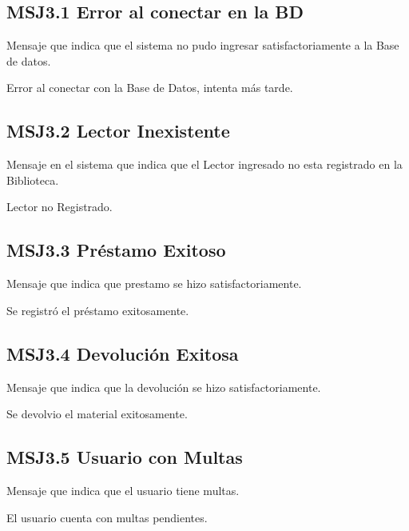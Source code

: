 


\subsection{MSJ3.1 Error al conectar en la BD }

Mensaje que indica que el sistema no pudo ingresar satisfactoriamente a la Base de datos.

  \noindent Error al conectar con la Base de Datos, intenta más tarde.

\subsection{MSJ3.2 Lector Inexistente }

Mensaje en el sistema que indica que el Lector ingresado no esta registrado en la Biblioteca.

  \noindent Lector no Registrado.
 
\subsection{MSJ3.3 Préstamo Exitoso }

Mensaje que indica que prestamo se hizo satisfactoriamente.

  \noindent Se registró el préstamo exitosamente.
  
\subsection{MSJ3.4 Devolución Exitosa }

Mensaje que indica que la devolución se hizo satisfactoriamente.

  \noindent Se devolvio el material exitosamente.
  
\subsection{MSJ3.5 Usuario con Multas }

Mensaje que indica que el usuario tiene multas.

  \noindent El usuario cuenta con multas pendientes.
  
